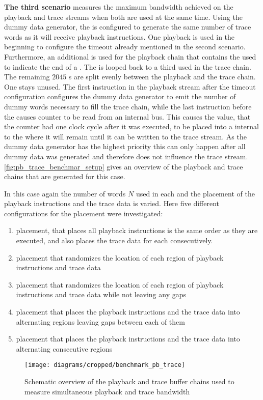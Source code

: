 \textbf{The third scenario} measures the maximum bandwidth achieved on the playback and trace streams when both are used at the same time. Using the dummy data generator, the \pbexec{} is configured to generate the same number of trace words as it will receive playback instructions. One playback \descriptor{} is used in the beginning to configure the timeout already mentioned in the second scenario. Furthermore, an additional \descriptor{} is used for the playback chain that contains the \haltInstr{} used to indicate the end of a \PlaybackProgram{}. The \haltInstr{} is looped back to a third \descriptor{} used in the trace chain. The remaining $\num{2045}$ \descriptor{}s are split evenly between the playback and the trace chain. One \descriptor{} stays unused. The first instruction in the playback stream after the timeout configuration configures the dummy data generator to emit the number of dummy words necessary to fill the trace \descriptor{} chain, while the last instruction before the \haltInstr{} causes \systime{} counter to be read from  an \FPGA{} internal bus. This causes the value, that the \systime{} counter had one clock cycle after it was executed, to be placed into a \FIFO{} internal to the \pbexec{} where it will remain until it can be written to the trace stream. As the dummy data generator has the highest priority this can only happen after all dummy data was generated and therefore does not influence the trace stream. \autoref{fig:pb_trace_benchmar_setup} gives an overview of the playback and trace chains that are generated for this case.

In this case again the number of words $N$ used in each \descriptor{} and the placement of the playback instructions and the trace data is varied.
Here five different configurations for the placement were investigated:
\begin{enumerate}
  \item \linear{} placement, that places all playback instructions is the same order as they are executed, and also places the trace data for each \descriptor{} consecutively.
  \item \random{} placement that randomizes the location of each region of playback instructions and trace data
  \item \randomDense{} placement that randomizes the location of each region of playback instructions and trace data while not leaving any gaps
  \item \interleaved{} placement that places the playback instructions and the trace data into alternating regions leaving gaps between each of them
  \item \interleavedDense{} placement that places the playback instructions and the trace data into alternating consecutive regions
\end{enumerate}

\begin{figure}[htbp]
\centerline{\texttt{[image: diagrams/cropped/benchmark\_pb\_trace]}}
\caption{Schematic overview of the playback and trace buffer chains used to measure simultaneous playback and trace bandwidth}\label{fig:pb_trace_benchmar_setup}
\end{figure}
